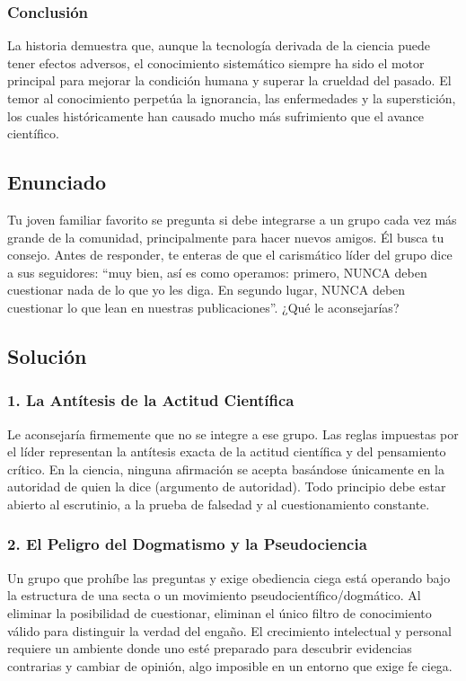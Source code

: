 \documentclass[12pt, a4paper]{article}
\begin{document}
\subsubsection*{Conclusión}
La historia demuestra que, aunque la tecnología derivada de la ciencia puede tener efectos adversos, el conocimiento sistemático siempre ha sido el motor principal para mejorar la condición humana y superar la crueldad del pasado. El temor al conocimiento perpetúa la ignorancia, las enfermedades y la superstición, los cuales históricamente han causado mucho más sufrimiento que el avance científico.

\newpage

\subsection*{Enunciado}
Tu joven familiar favorito se pregunta si debe integrarse a un grupo cada vez más grande de la comunidad, principalmente para hacer nuevos amigos. Él busca tu consejo. Antes de responder, te enteras de que el carismático líder del grupo dice a sus seguidores: ``muy bien, así es como operamos: primero, NUNCA deben cuestionar nada de lo que yo les diga. En segundo lugar, NUNCA deben cuestionar lo que lean en nuestras publicaciones''. ¿Qué le aconsejarías?

\subsection*{Solución}

\subsubsection*{1. La Antítesis de la Actitud Científica}
Le aconsejaría firmemente que no se integre a ese grupo. Las reglas impuestas por el líder representan la antítesis exacta de la actitud científica y del pensamiento crítico. En la ciencia, ninguna afirmación se acepta basándose únicamente en la autoridad de quien la dice (argumento de autoridad). Todo principio debe estar abierto al escrutinio, a la prueba de falsedad y al cuestionamiento constante. 

\subsubsection*{2. El Peligro del Dogmatismo y la Pseudociencia}
Un grupo que prohíbe las preguntas y exige obediencia ciega está operando bajo la estructura de una secta o un movimiento pseudocientífico/dogmático. Al eliminar la posibilidad de cuestionar, eliminan el único filtro de conocimiento válido para distinguir la verdad del engaño. El crecimiento intelectual y personal requiere un ambiente donde uno esté preparado para descubrir evidencias contrarias y cambiar de opinión, algo imposible en un entorno que exige fe ciega.
\end{document}
